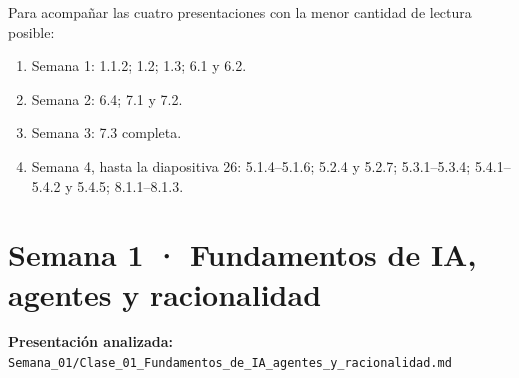 \documentclass[10pt,a4paper]{article}
\begin{document}
Para acompañar las cuatro presentaciones con la menor cantidad de lectura posible:

\begin{enumerate}[leftmargin=1.6em,itemsep=2pt]
  \item Semana 1: 1.1.2; 1.2; 1.3; 6.1 y 6.2.
  \item Semana 2: 6.4; 7.1 y 7.2.
  \item Semana 3: 7.3 completa.
  \item Semana 4, hasta la diapositiva 26: 5.1.4--5.1.6; 5.2.4 y 5.2.7; 5.3.1--5.3.4; 5.4.1--5.4.2 y 5.4.5; 8.1.1--8.1.3.
\end{enumerate}

\newpage
\section*{Semana 1 · Fundamentos de IA, agentes y racionalidad}

\textbf{Presentación analizada:} \texttt{Semana\_01/Clase\_01\_Fundamentos\_de\_IA\_agentes\_y\_racionalidad.md}
\end{document}
